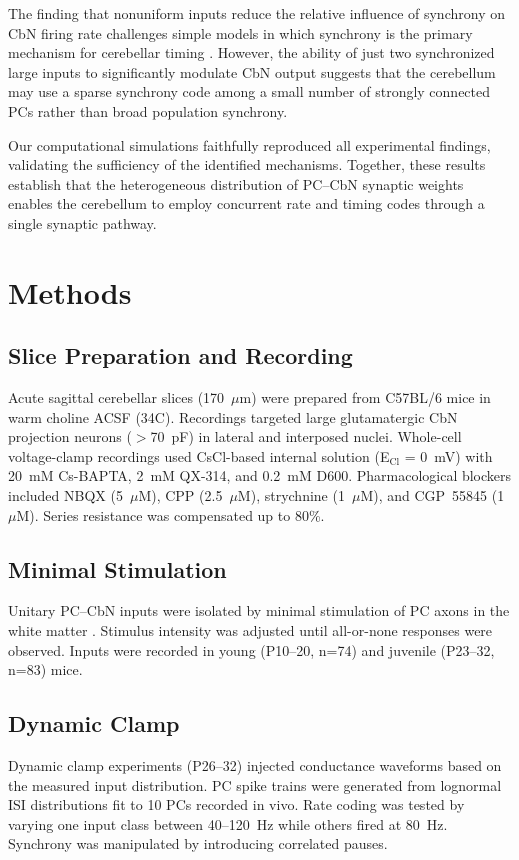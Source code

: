 \documentclass[11pt]{article}
\begin{document}
The finding that nonuniform inputs reduce the relative influence of synchrony on CbN firing rate challenges simple models in which synchrony is the primary mechanism for cerebellar timing \citep{heck2007contributions}. However, the ability of just two synchronized large inputs to significantly modulate CbN output suggests that the cerebellum may use a sparse synchrony code among a small number of strongly connected PCs rather than broad population synchrony.

Our computational simulations faithfully reproduced all experimental findings, validating the sufficiency of the identified mechanisms. Together, these results establish that the heterogeneous distribution of PC--CbN synaptic weights enables the cerebellum to employ concurrent rate and timing codes through a single synaptic pathway.

\section{Methods}

\subsection{Slice Preparation and Recording}
Acute sagittal cerebellar slices (170~$\mu$m) were prepared from C57BL/6 mice in warm choline ACSF (34\textdegree C). Recordings targeted large glutamatergic CbN projection neurons ($>$70~pF) in lateral and interposed nuclei. Whole-cell voltage-clamp recordings used CsCl-based internal solution (E$_\mathrm{Cl}$ = 0~mV) with 20~mM Cs-BAPTA, 2~mM QX-314, and 0.2~mM D600. Pharmacological blockers included NBQX (5~$\mu$M), CPP (2.5~$\mu$M), strychnine (1~$\mu$M), and CGP~55845 (1~$\mu$M). Series resistance was compensated up to 80\%.

\subsection{Minimal Stimulation}
Unitary PC--CbN inputs were isolated by minimal stimulation of PC axons in the white matter \citep{telgkamp2004maintenance}. Stimulus intensity was adjusted until all-or-none responses were observed. Inputs were recorded in young (P10--20, n=74) and juvenile (P23--32, n=83) mice.

\subsection{Dynamic Clamp}
Dynamic clamp experiments (P26--32) injected conductance waveforms based on the measured input distribution. PC spike trains were generated from lognormal ISI distributions fit to 10 PCs recorded in vivo. Rate coding was tested by varying one input class between 40--120~Hz while others fired at 80~Hz. Synchrony was manipulated by introducing correlated pauses.
\end{document}

